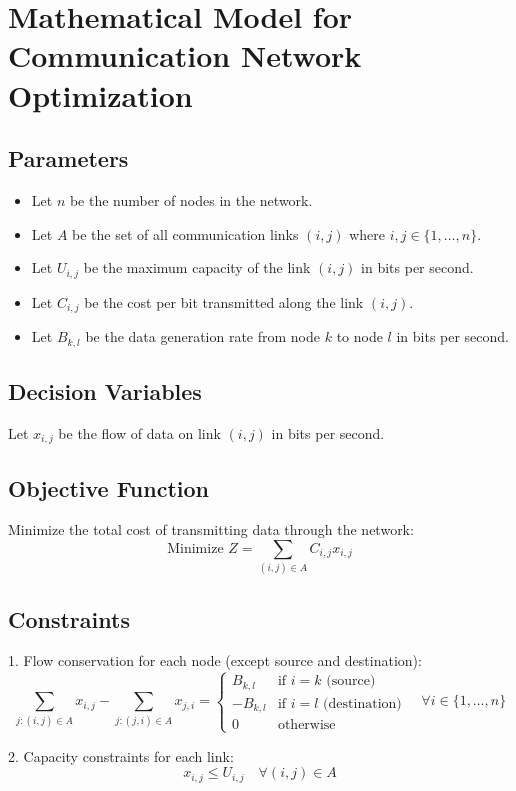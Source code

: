\documentclass{article}
\begin{document}
\section*{Mathematical Model for Communication Network Optimization}

\subsection*{Parameters}
\begin{itemize}
    \item Let $n$ be the number of nodes in the network.
    \item Let $A$ be the set of all communication links $(i,j)$ where $i,j \in \{1,\ldots,n\}$.
    \item Let $U_{i,j}$ be the maximum capacity of the link $(i,j)$ in bits per second.
    \item Let $C_{i,j}$ be the cost per bit transmitted along the link $(i,j)$.
    \item Let $B_{k,l}$ be the data generation rate from node $k$ to node $l$ in bits per second.
\end{itemize}

\subsection*{Decision Variables}
Let $x_{i,j}$ be the flow of data on link $(i,j)$ in bits per second.

\subsection*{Objective Function}
Minimize the total cost of transmitting data through the network:
\[
\text{Minimize } Z = \sum_{(i,j) \in A} C_{i,j} x_{i,j}
\]

\subsection*{Constraints}
1. Flow conservation for each node (except source and destination):
\[
\sum_{j: (i,j) \in A} x_{i,j} - \sum_{j: (j,i) \in A} x_{j,i} = 
\begin{cases}
B_{k,l} & \text{if } i = k \text{ (source)} \\
-B_{k,l} & \text{if } i = l \text{ (destination)} \\
0 & \text{otherwise}
\end{cases}
\quad \forall i \in \{1,\ldots,n\}
\]

2. Capacity constraints for each link:
\[
x_{i,j} \leq U_{i,j} \quad \forall (i,j) \in A
\]
\end{document}
